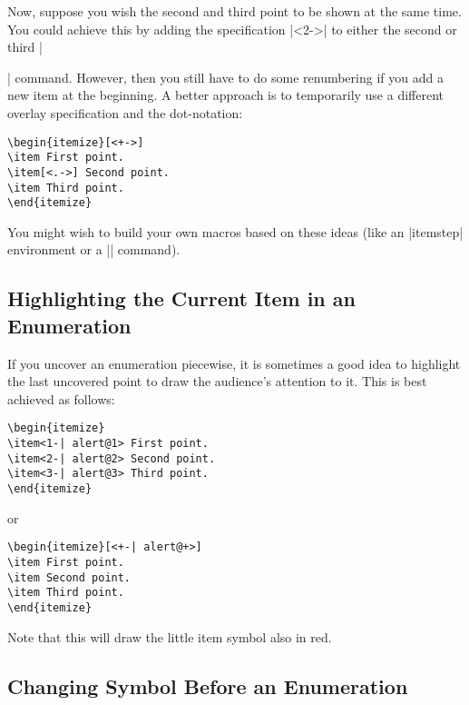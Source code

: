 Now, suppose you wish the second and third point to be shown at the same time. You could achieve this by adding the specification |<2->| to either the second or third |\item| command. However, then you still have to do some renumbering if you add a new item at the beginning. A better approach is to temporarily use a different overlay specification and the dot-notation:
\begin{verbatim}
\begin{itemize}[<+->]
\item First point.
\item[<.->] Second point.
\item Third point.
\end{itemize}
\end{verbatim}

You might wish to build your own macros based on these ideas (like an |itemstep| environment or a |\itemlikeprevious| command).


\subsection{Highlighting the Current Item in an Enumeration}

If you uncover an enumeration piecewise, it is sometimes a good idea to highlight the last uncovered point to draw the audience's attention to it. This is best achieved as follows:
\begin{verbatim}
\begin{itemize}
\item<1-| alert@1> First point.
\item<2-| alert@2> Second point.
\item<3-| alert@3> Third point.
\end{itemize}
\end{verbatim}

or
\begin{verbatim}
\begin{itemize}[<+-| alert@+>]
\item First point.
\item Second point.
\item Third point.
\end{itemize}
\end{verbatim}

Note that this will draw the little item symbol also in red.


\subsection{Changing Symbol Before an Enumeration}

